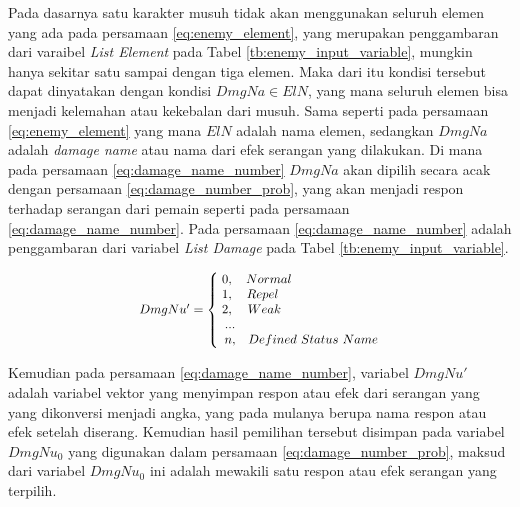 Pada dasarnya satu karakter musuh tidak akan menggunakan seluruh elemen yang ada pada persamaan \ref{eq:enemy_element}, yang merupakan penggambaran dari varaibel \textit{List Element} pada Tabel \ref{tb:enemy_input_variable}, mungkin hanya sekitar satu sampai dengan tiga elemen. Maka dari itu kondisi tersebut dapat dinyatakan dengan kondisi $DmgNa \in ElN$, yang mana seluruh elemen bisa menjadi kelemahan atau kekebalan dari musuh. Sama seperti pada persamaan \ref{eq:enemy_element} yang mana $ElN$ adalah nama elemen, sedangkan $DmgNa$ adalah \textit{damage name} atau nama dari efek serangan yang dilakukan. Di mana pada persamaan \ref{eq:damage_name_number} $DmgNa$ akan dipilih secara acak dengan persamaan \ref{eq:damage_number_prob}, yang akan menjadi respon terhadap serangan dari pemain seperti pada persamaan \ref{eq:damage_name_number}. Pada persamaan \ref{eq:damage_name_number} adalah penggambaran dari variabel \textit{List Damage} pada Tabel \ref{tb:enemy_input_variable}.
\vspace{1ex}

\begin{equation}\label{eq:damage_name_number}
\resizebox{0.5\textwidth}{!}{%
	$DmgNu' = \left\{\begin{matrix} 
	\hspace{0.0em} 0,  & \hspace{-7.0em} Normal \\
	\hspace{0.0em} 1,  & \hspace{-8.0em} Repel \\
	\hspace{0.0em} 2,  & \hspace{-7.7em} Weak \\
	\hspace{0.5em} ... & \\
	\hspace{0.5em} n,  & Defined\ Status\ Name
	\end{matrix}\right.$%
}
\end{equation}

Kemudian pada persamaan \ref{eq:damage_name_number}, variabel $DmgNu'$ adalah variabel vektor yang menyimpan respon atau efek dari serangan yang yang dikonversi menjadi angka, yang pada mulanya berupa nama respon atau efek setelah diserang. Kemudian hasil pemilihan tersebut disimpan pada variabel $DmgNu_{0}$ yang digunakan dalam persamaan \ref{eq:damage_number_prob}, maksud dari variabel $DmgNu_{0}$ ini adalah mewakili satu respon atau efek serangan yang terpilih.
\vspace{1ex}

